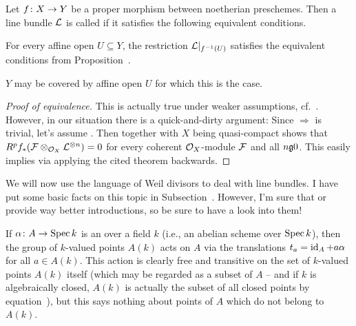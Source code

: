 \documentclass[a4paper,parskip=half,numbers=enddot, DIV=12]{scrreprt}
\begin{document}
\begin{defi}
	Let $f\colon X\morphism Y$ be a proper morphism between noetherian preschemes. Then a line bundle $\mathcal{L}$ is called  if it satisfies the following equivalent conditions.
	\begin{alphanumerate}
		\item For every affine open $U\subseteq Y$, the restriction $\mathcal{L}|_{f^{-1}(U)}$ satisfies the equivalent conditions from Proposition~.
		\item $Y$ may be covered by affine open $U$ for which this is the case.
	\end{alphanumerate}
\end{defi}
\begin{proof}[Proof of equivalence]
	This is actually true under weaker assumptions, cf.\ \cite[]{stacks-project}. However, in our situation there is a quick-and-dirty argument: Since  $\Rightarrow$  is trivial, let's assume . Then \cite[Theorem~6 and ]{alggeo2} together with $X$ being quasi-compact shows that $R^pf_*(\mathcal{F}\otimes_{\mathcal{O}_X}\mathcal{L}^{\otimes n})=0$ for every coherent $\mathcal{O}_X$-module $\mathcal{F}$ and all $n\gge 0$. This easily implies  via applying the cited theorem backwards.
\end{proof}
We will now use the language of Weil divisors to deal with line bundles. I have put some basic facts on this topic in Subsection~. However, I'm sure that \cite[]{stacks-project} or \cite[Section~II.6]{hartshorne} provide way better introductions, so be sure to have a look into them!

If $\alpha\colon A\morphism\Spec k$ is an  over a field $k$ (i.e., an abelian scheme over $\operatorname{Spec} k$), then the group of $k$-valued points $A(k)$ acts on $A$ via the translations $t_a=\operatorname{id}_A+a\alpha$ for all $a\in A(k)$. This action is clearly free and transitive on the set of $k$-valued points $A(k)$ itself (which may be regarded as a subset of $A$ -- and if $k$ is algebraically closed, $A(k)$ is actually the subset of all closed points by equation~), but this says nothing about points of $A$ which do not belong to $A(k)$.
\end{document}
